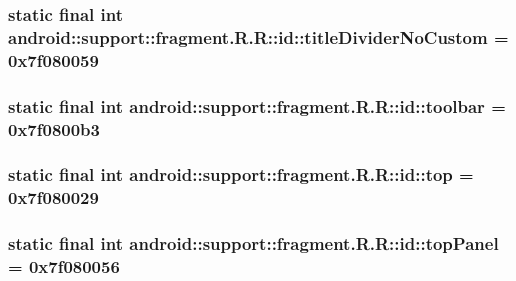 \hypertarget{classandroid_1_1support_1_1fragment_1_1_r_1_1id_ea3ae7b7e9ba98e0b73542cd29ff142e}{
\subsubsection[{titleDividerNoCustom}]{\setlength{\rightskip}{0pt plus 5cm}static final int android::support::fragment.R.R::id::titleDividerNoCustom = 0x7f080059}}
\label{classandroid_1_1support_1_1fragment_1_1_r_1_1id_ea3ae7b7e9ba98e0b73542cd29ff142e}


\hypertarget{classandroid_1_1support_1_1fragment_1_1_r_1_1id_8eaff57be097bd675ff13e355ea80599}{
\subsubsection[{toolbar}]{\setlength{\rightskip}{0pt plus 5cm}static final int android::support::fragment.R.R::id::toolbar = 0x7f0800b3}}
\label{classandroid_1_1support_1_1fragment_1_1_r_1_1id_8eaff57be097bd675ff13e355ea80599}


\hypertarget{classandroid_1_1support_1_1fragment_1_1_r_1_1id_3252f0b98513774319cef84d5536590c}{
\subsubsection[{top}]{\setlength{\rightskip}{0pt plus 5cm}static final int android::support::fragment.R.R::id::top = 0x7f080029}}
\label{classandroid_1_1support_1_1fragment_1_1_r_1_1id_3252f0b98513774319cef84d5536590c}


\hypertarget{classandroid_1_1support_1_1fragment_1_1_r_1_1id_e734736fb245e52c379b8137e4edf34c}{
\subsubsection[{topPanel}]{\setlength{\rightskip}{0pt plus 5cm}static final int android::support::fragment.R.R::id::topPanel = 0x7f080056}}
\label{classandroid_1_1support_1_1fragment_1_1_r_1_1id_e734736fb245e52c379b8137e4edf34c}


